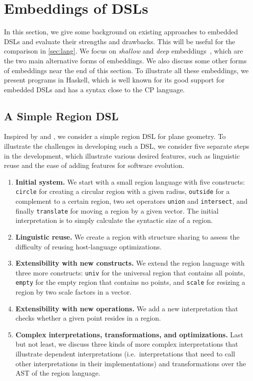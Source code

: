 \section{Embeddings of DSLs} \label{sec:embed}

In this section, we give some background on existing approaches to embedded DSLs
and evaluate their strengths and drawbacks. This will be useful for the
comparison in \autoref{sec:lang}. We focus on \emph{shallow} and \emph{deep}
embeddings~\citep{boulton1992experience}, which are the two main alternative
forms of embeddings. We also discuss some other forms of embeddings near the end
of this section. To illustrate all these embeddings, we present programs in
Haskell, which is well known for its good support for embedded DSLs and has a
syntax close to the CP language.

\subsection{A Simple Region DSL}

Inspired by \citet{hudak1998modular} and \citet{hofer2008polymorphic}, we
consider a simple region DSL for plane geometry. To illustrate the challenges in
developing such a DSL, we consider five separate steps in the development, which
illustrate various desired features, such as linguistic reuse and the ease of
adding features for software evolution.

\begin{enumerate}
\item \textbf{Initial system.}
      We start with a small region language with five constructs:
      \lstinline{circle} for creating a circular region with a given radius,
      \lstinline{outside} for a complement to a certain region,
      two set operators \lstinline{union} and \lstinline{intersect}, and finally
      \lstinline{translate} for moving a region by a given vector.
      The initial interpretation is to simply calculate the syntactic size of a region.
\item \textbf{Linguistic reuse.}
      We create a region with structure sharing to assess the difficulty of
      reusing host-language optimizations.
\item \textbf{Extensibility with new constructs.}
      We extend the region language with three more constructs:
      \lstinline{univ} for the universal region that contains all points,
      \lstinline{empty} for the empty region that contains no points, and
      \lstinline{scale} for resizing a region by two scale factors in a vector.
\item \textbf{Extensibility with new operations.}
      We add a new interpretation that checks whether a given point resides in a region.
\item \textbf{Complex interpretations, transformations, and optimizations.}
      Last but not least, we discuss three kinds of more complex interpretations
      that illustrate dependent interpretations (i.e.~interpretations that need
      to call other interpretations in their implementations) and
      transformations over the AST of the region language. 
\end{enumerate}


